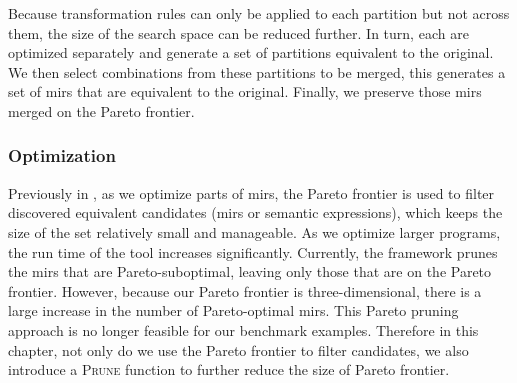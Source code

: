 Because transformation rules can only be applied to each partition but not
across them, the size of the search space can be reduced further.  In turn,
each are optimized separately and generate a set of partitions equivalent to
the original.  We then select combinations from these partitions to be merged,
this generates a set of \glspl{mir} that are equivalent to the original.
Finally, we preserve those \glspl{mir} merged on the Pareto frontier.

\subsubsection{Optimization}



Previously in \soap, as we optimize parts of \glspl{mir}, the Pareto
frontier is used to filter discovered equivalent candidates (\glspl{mir} or
semantic expressions), which keeps the size of the set relatively small and
manageable.  As we optimize larger programs, the run time of the tool increases
significantly.  Currently, the \soap{} framework prunes the \glspl{mir} that
are Pareto-suboptimal, leaving only those that are on the Pareto frontier.
However, because our Pareto frontier is three-dimensional, there is a large
increase in the number of Pareto-optimal \glspl{mir}.  This Pareto pruning
approach is no longer feasible for our benchmark examples.  Therefore in this
chapter, not only do we use the Pareto frontier to filter candidates, we also
introduce a \textsc{Prune} function to further reduce the size of Pareto
frontier.

